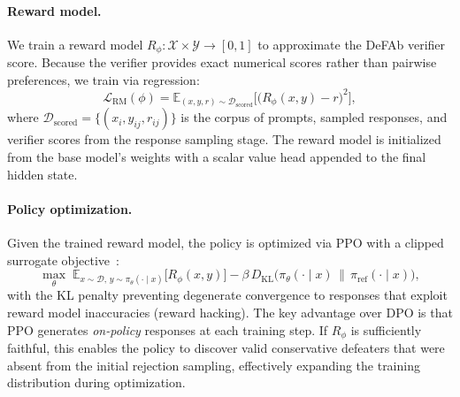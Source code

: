 \documentclass{article}
\theoremstyle{definition}
\begin{document}
\paragraph{Reward model.} We train a reward model $R_\phi: \mathcal{X} \times \mathcal{Y} \to [0, 1]$ to approximate the DeFAb verifier score. Because the verifier provides exact numerical scores rather than pairwise preferences, we train via regression:
\begin{equation}\label{eq:reward_model}
    \mathcal{L}_{\mathrm{RM}}(\phi) = \mathbb{E}_{(x, y, r) \sim \mathcal{D}_{\mathrm{scored}}} \bigl[\bigl(R_\phi(x, y) - r\bigr)^2 \bigr],
\end{equation}
where $\mathcal{D}_{\mathrm{scored}} = \{(x_i, y_{ij}, r_{ij})\}$ is the corpus of prompts, sampled responses, and verifier scores from the response sampling stage. The reward model is initialized from the base model's weights with a scalar value head appended to the final hidden state.

\paragraph{Policy optimization.} Given the trained reward model, the policy is optimized via PPO with a clipped surrogate objective~\cite{schulman2017proximal}:
\begin{equation}\label{eq:ppo_obj}
    \max_\theta \; \mathbb{E}_{x \sim \mathcal{D},\, y \sim \pi_\theta(\cdot \mid x)} \bigl[ R_\phi(x, y) \bigr] - \beta \, D_{\mathrm{KL}}\!\bigl(\pi_\theta(\cdot \mid x) \,\big\|\, \pi_{\mathrm{ref}}(\cdot \mid x)\bigr),
\end{equation}
with the KL penalty preventing degenerate convergence to responses that exploit reward model inaccuracies (reward hacking). The key advantage over DPO is that PPO generates \emph{on-policy} responses at each training step. If $R_\phi$ is sufficiently faithful, this enables the policy to discover valid conservative defeaters that were absent from the initial rejection sampling, effectively expanding the training distribution during optimization.
\end{document}
